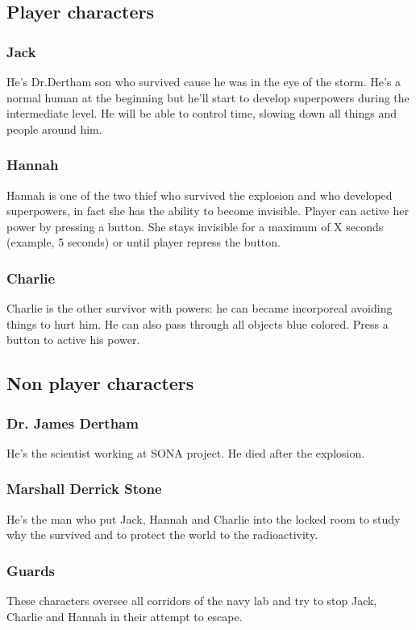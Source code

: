 \subsection{Player characters}
\subsubsection {Jack}
He's Dr.Dertham son who survived cause he was in the eye of the storm. He's a normal human at the beginning but he'll start to develop superpowers during the intermediate level. He will be able to control time, slowing down all things and people around him.

\subsubsection {Hannah}
Hannah is one of the two thief who survived the explosion and who developed superpowers, in fact she has the ability to become invisible. Player can active her power by pressing a button. She stays invisible for a maximum of X seconds (example, 5 seconds) or until player repress the button. 

\subsubsection {Charlie}
Charlie is the other survivor with powers: he can became incorporeal avoiding things to hurt him. He can also pass through all objects blue colored. Press a button to active his power.

\subsection{Non player characters}
\subsubsection {Dr. James Dertham}
He's the scientist working at SONA project. He died after the explosion.

\subsubsection {Marshall Derrick Stone}
He's the man who put Jack, Hannah and Charlie into the locked room to study why the survived and to protect the world to the radioactivity.

\subsubsection {Guards}
These characters oversee all corridors of the navy lab and try to stop Jack, Charlie and Hannah in their attempt to escape.